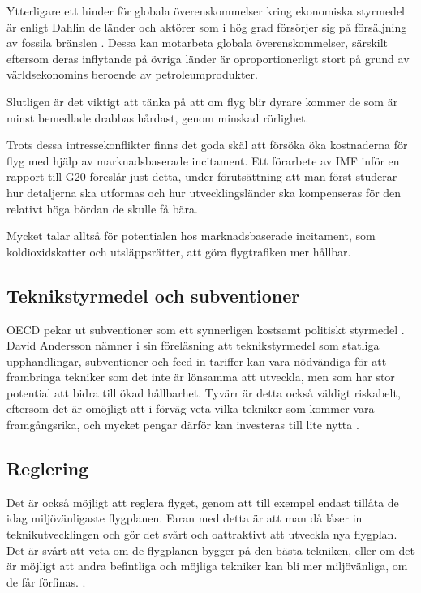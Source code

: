 \documentclass{article}
\begin{document}
Ytterligare ett hinder för globala överenskommelser kring ekonomiska styrmedel är enligt Dahlin de länder och aktörer som i hög grad försörjer sig på försäljning av fossila bränslen . Dessa kan motarbeta globala överenskommelser, särskilt eftersom deras inflytande på övriga länder är oproportionerligt stort på grund av världsekonomins beroende av petroleumprodukter.

Slutligen är det viktigt att tänka på att om flyg blir dyrare kommer de som är minst bemedlade drabbas hårdast, genom minskad rörlighet.

Trots dessa intressekonflikter finns det goda skäl att försöka öka kostnaderna för flyg med hjälp av marknadsbaserade incitament. Ett förarbete av IMF inför en rapport till G20  föreslår just detta, under förutsättning att man först studerar hur detaljerna ska utformas och hur utvecklingsländer ska kompenseras för den relativt höga bördan de skulle få bära.

Mycket talar alltså för potentialen hos marknadsbaserade incitament, som koldioxidskatter och utsläppsrätter, att göra flygtrafiken mer hållbar.

\subsection{Teknikstyrmedel och subventioner}

OECD pekar ut subventioner som ett synnerligen kostsamt politiskt styrmedel . David Andersson nämner i sin föreläsning att teknikstyrmedel som statliga upphandlingar, subventioner och feed-in-tariffer kan vara nödvändiga för att frambringa tekniker som det inte är lönsamma att utveckla, men som har stor potential att bidra till ökad hållbarhet. Tyvärr är detta också väldigt riskabelt, eftersom det är omöjligt att i förväg veta vilka tekniker som kommer vara framgångsrika, och mycket pengar därför kan investeras till lite nytta .

\subsection{Reglering}

Det är också möjligt att reglera flyget, genom att till exempel endast tillåta de idag miljövänligaste flygplanen. Faran med detta är att man då låser in teknikutvecklingen och gör det svårt och oattraktivt att utveckla nya flygplan. Det är svårt att veta om de flygplanen bygger på den bästa tekniken, eller om det är möjligt att andra befintliga och möjliga tekniker kan bli mer miljövänliga, om de får förfinas. .
\end{document}
